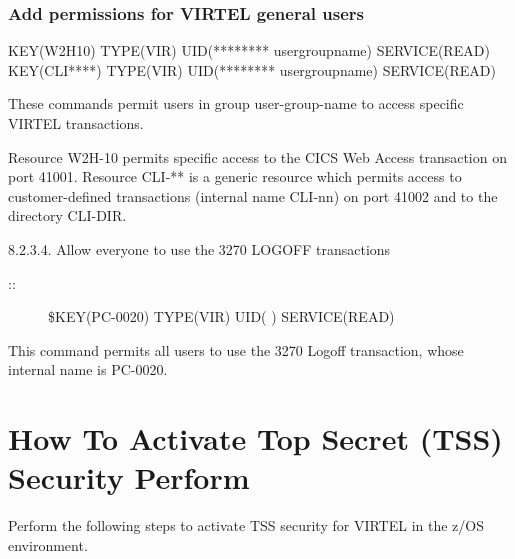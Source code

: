 \documentclass[letterpaper,10pt,english]{sphinxmanual}
\begin{document}
\subsubsection{Add permissions for VIRTEL general users}
\label{\detokenize{Installation_Guide:index-182}}\label{\detokenize{Installation_Guide:add-permissions-for-virtel-general-users}}
\begin{sphinxVerbatim}[commandchars=\\\{\}]
\PYGZdl{}KEY(W2H\PYGZhy{}10) TYPE(VIR) UID(******** user\PYGZhy{}group\PYGZhy{}name) SERVICE(READ)
\PYGZdl{}KEY(CLI\PYGZhy{}****) TYPE(VIR) UID(******** user\PYGZhy{}group\PYGZhy{}name) SERVICE(READ)
\end{sphinxVerbatim}


These commands permit users in group user-group-name to access specific VIRTEL transactions.

Resource W2H-10 permits specific access to the CICS Web Access transaction on port 41001. Resource CLI-** is a generic resource which permits access to customer-defined transactions (internal name CLI-nn) on port 41002 and to the directory CLI-DIR.

8.2.3.4. Allow everyone to use the 3270 LOGOFF transactions
\begin{description}
\item[{::}] \leavevmode
\$KEY(PC-0020) TYPE(VIR) UID(\sphinxstylestrong{****} \sphinxstylestrong{****}) SERVICE(READ)

\end{description}


This command permits all users to use the 3270 Logoff transaction, whose internal name is PC-0020.

\newpage


\section{How To Activate Top Secret (TSS) Security Perform}
\label{\detokenize{Installation_Guide:index-183}}\label{\detokenize{Installation_Guide:how-to-activate-top-secret-tss-security-perform}}
Perform the following steps to activate TSS security for VIRTEL in the z/OS environment.
\end{document}
